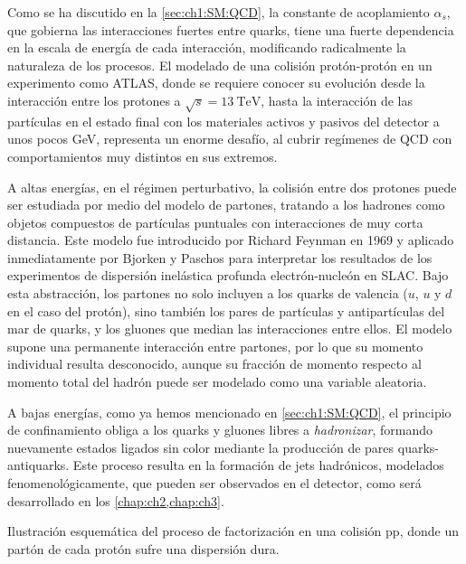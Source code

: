 Como se ha discutido en la \cref{sec:ch1:SM:QCD}, la constante de acoplamiento $\alpha_s$, que gobierna las interacciones fuertes entre quarks, tiene una fuerte dependencia en la escala de energía de cada interacción, modificando radicalmente la naturaleza de los procesos. El modelado de una colisión protón-protón en un experimento como ATLAS, donde se requiere conocer su evolución desde la interacción entre los protones a $\sqrt{s} = \SI{13}{\TeV}$, hasta la interacción de las partículas en el estado final con los materiales activos y pasivos del detector a unos pocos \si{\GeV}, representa un enorme desafío, al cubrir regímenes de QCD con comportamientos muy distintos en sus extremos.

A altas energías, en el régimen perturbativo, la colisión entre dos protones puede ser estudiada por medio del modelo de partones, tratando a los hadrones como objetos compuestos de partículas puntuales con interacciones de muy corta distancia. Este modelo fue introducido por Richard Feynman en 1969 y aplicado inmediatamente por Bjorken y Paschos para interpretar los resultados de los experimentos de dispersión inelástica profunda electrón-nucleón en SLAC. Bajo esta abstracción, los partones no solo incluyen a los quarks de valencia ($u$, $u$ y $d$ en el caso del protón), sino también los pares de partículas y antipartículas del mar de quarks, y los gluones que median las interacciones entre ellos. El modelo supone una permanente interacción entre partones, por lo que su momento individual resulta desconocido, aunque su fracción de momento respecto al momento total del hadrón puede ser modelado como una variable aleatoria.

A bajas energías, como ya hemos mencionado en \ref{sec:ch1:SM:QCD}, el principio de confinamiento obliga a los quarks y gluones libres a \textit{hadronizar}, formando nuevamente estados ligados sin color mediante la producción de pares quarks-antiquarks. Este proceso resulta en la formación de jets hadrónicos, modelados fenomenológicamente, que pueden ser observados en el detector, como será desarrollado en los \cref{chap:ch2,chap:ch3}.

\begin{marginfigure}
  \centering
  
  \caption{Ilustración esquemática del proceso de factorización en una colisión pp, donde un partón de cada protón sufre una dispersión dura.}
  \label{fig:ch1:SM:pp_interactions:factorization}
\end{marginfigure}

